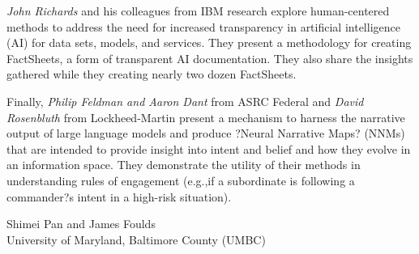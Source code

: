 \documentclass[11pt]{article}
\begin{document}
\textit{John Richards} and his colleagues from IBM research explore  human-centered methods to address the need for increased transparency in artificial intelligence (AI) for data sets, models, and services. They present a methodology for creating FactSheets, a form of transparent AI documentation. They also share the insights gathered while they creating nearly two dozen FactSheets.    

Finally, \textit{Philip Feldman and Aaron Dant} from ASRC Federal and \textit{David Rosenbluth} from Lockheed-Martin present a mechanism to harness the narrative output of large language models and produce ?Neural Narrative Maps? (NNMs) that are intended to provide insight into intent and belief and how they evolve in an information space. They demonstrate the utility of their methods in understanding rules of engagement (e.g.,if a subordinate is following a commander?s intent in a high-risk situation).  

\begin{flushright}
Shimei Pan and James Foulds\\ University of Maryland, Baltimore County (UMBC)
\end{flushright}
\end{document}

